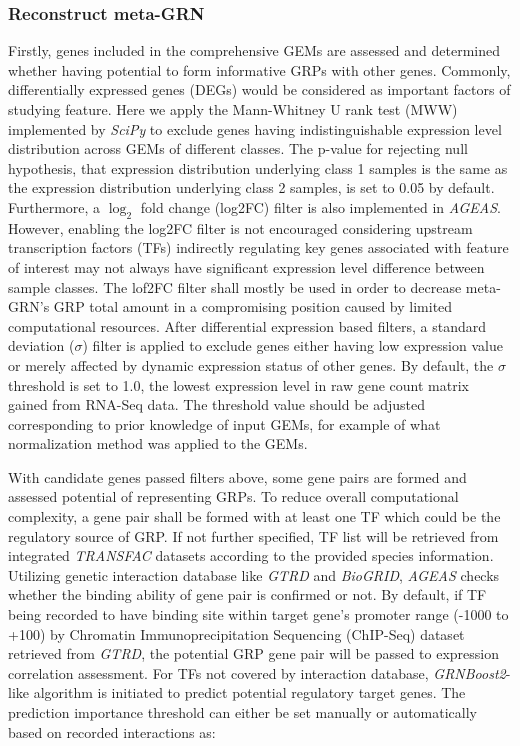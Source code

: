 \documentclass[fleqn,10pt]{wlscirep}
\begin{document}
    \subsubsection*{Reconstruct meta-GRN}
      Firstly, genes included in the comprehensive GEMs are assessed and determined whether having potential to form informative GRPs with other genes.
      Commonly, differentially expressed genes (DEGs) would be considered as important factors of studying feature.
      Here we apply the Mann-Whitney U rank test (MWW) implemented by \emph{SciPy}\cite{2020SciPy-NMeth} to exclude genes having indistinguishable expression level distribution across GEMs of different classes.
      The p-value for rejecting null hypothesis, that expression distribution underlying class 1 samples is the same as the expression distribution underlying class 2 samples, is set to 0.05 by default.
      Furthermore, a $\log_2$ fold change (log2FC) filter is also implemented in \emph{AGEAS}.
      However, enabling the log2FC filter is not encouraged considering upstream transcription factors (TFs) indirectly regulating key genes associated with feature of interest may not always have significant expression level difference between sample classes.
      The lof2FC filter shall mostly be used in order to decrease meta-GRN's GRP total amount in a compromising position caused by limited computational resources.
      After differential expression based filters, a standard deviation ($\sigma$) filter is applied to exclude genes either having low expression value or merely affected by dynamic expression status of other genes.
      By default, the $\sigma$ threshold is set to 1.0, the lowest expression level in raw gene count matrix gained from RNA-Seq data.
      The threshold value should be adjusted corresponding to prior knowledge of input GEMs, for example of what normalization method was applied to the GEMs.

      With candidate genes passed filters above, some gene pairs are formed and assessed potential of representing GRPs.
      To reduce overall computational complexity, a gene pair shall be formed with at least one TF which could be the regulatory source of GRP.
      If not further specified, TF list will be retrieved from integrated \emph{TRANSFAC}\cite{transfac} datasets according to the provided species information.
      Utilizing genetic interaction database like \emph{GTRD}\cite{gkaa1057} and \emph{BioGRID}\cite{biogrid}, \emph{AGEAS} checks whether the binding ability of gene pair is confirmed or not.
      By default, if TF being recorded to have binding site within target gene's promoter range (-1000 to +100) by Chromatin Immunoprecipitation Sequencing (ChIP-Seq) dataset retrieved from \emph{GTRD}\cite{gkaa1057}, the potential GRP gene pair will be passed to expression correlation assessment.
      For TFs not covered by interaction database, \emph{GRNBoost2}\cite{grnboost2}-like algorithm is initiated to predict potential regulatory target genes.
      The prediction importance threshold can either be set manually or automatically based on recorded interactions as:
\end{document}
